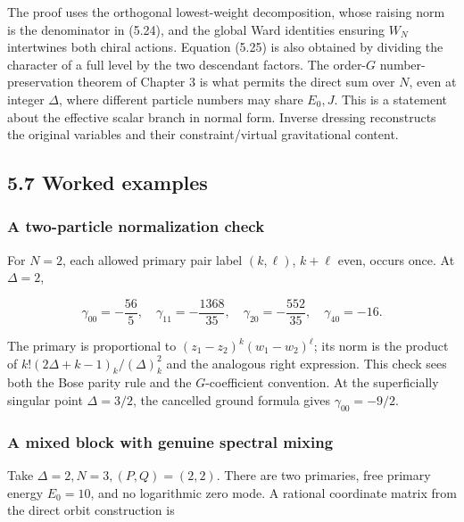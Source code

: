\documentclass[a4paper,11pt]{article}
\numberwithin{equation}{section}
\begin{document}
The proof uses the orthogonal lowest-weight decomposition, whose raising norm is the denominator in (5.24), and the global Ward identities ensuring \(W_N\) intertwines both chiral actions. Equation (5.25) is also obtained by dividing the character of a full level by the two descendant factors. The order-\(G\) number-preservation theorem of Chapter 3 is what permits the direct sum over \(N\), even at integer \(\Delta\), where different particle numbers may share \(E_0,J\). This is a statement about the effective scalar branch in normal form. Inverse dressing reconstructs the original variables and their constraint/virtual gravitational content.

\hypertarget{worked-examples}{%
\subsection{5.7 Worked examples}\label{worked-examples}}

\hypertarget{a-two-particle-normalization-check}{%
\subsubsection{A two-particle normalization check}\label{a-two-particle-normalization-check}}

For \(N=2\), each allowed primary pair label \((k,\ell)\), \(k+\ell\) even, occurs once. At \(\Delta=2\),

\[
\gamma_{00}=-\frac{56}{5},\quad
\gamma_{11}=-\frac{1368}{35},\quad
\gamma_{20}=-\frac{552}{35},\quad
\gamma_{40}=-16.
\tag{5.27}
\]

The primary is proportional to \((z_1-z_2)^k(w_1-w_2)^\ell\); its norm is the product of \(k!(2\Delta+k-1)_k/(\Delta)_k^2\) and the analogous right expression. This check sees both the Bose parity rule and the \(G\)-coefficient convention. At the superficially singular point \(\Delta=3/2\), the cancelled ground formula gives \(\gamma_{00}=-9/2\).

\hypertarget{a-mixed-block-with-genuine-spectral-mixing}{%
\subsubsection{A mixed block with genuine spectral mixing}\label{a-mixed-block-with-genuine-spectral-mixing}}

Take \(\Delta=2,N=3,(P,Q)=(2,2)\). There are two primaries, free primary energy \(E_0=10\), and no logarithmic zero mode. A rational coordinate matrix from the direct orbit construction is
\end{document}
